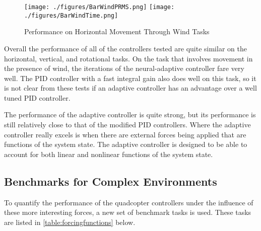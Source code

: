 \documentclass[letterpaper,12pt,titlepage,oneside,final]{book}
\begin{document}
\begin{figure}
\centering
\texttt{[image: ./figures/BarWindPRMS.png]}
\texttt{[image: ./figures/BarWindTime.png]}
\caption{Performance on Horizontal Movement Through Wind Tasks}\label{fig:bar_wind}
\captionsetup{singlelinecheck=off,font=footnotesize}
\caption*{}
\end{figure}




Overall the performance of all of the controllers tested are quite similar on the horizontal, vertical, and rotational tasks.
On the task that involves movement in the presence of wind, the iterations of the neural-adaptive controller fare very well.
The PID controller with a fast integral gain also does well on this task, so it is not clear from these tests if an adaptive controller has an advantage over a well tuned PID controller.

The performance of the adaptive controller is quite strong, but its performance is still relatively close to that of the modified PID controllers. 
Where the adaptive controller really excels is when there are external forces being applied that are functions of the system state. 
The adaptive controller is designed to be able to account for both linear and nonlinear functions of the system state.

\subsection{Benchmarks for Complex Environments}

To quantify the performance of the quadcopter controllers under the influence of these more interesting forces, a new set of benchmark tasks is used.
These tasks are listed in \autoref{table:forcingfunctions} below. %
\end{document}
